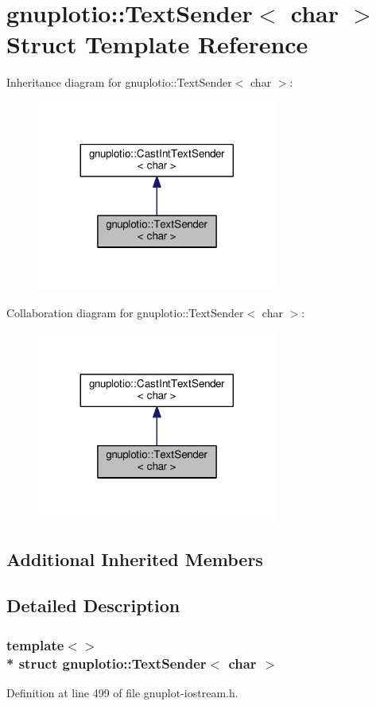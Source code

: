 \hypertarget{structgnuplotio_1_1_text_sender_3_01char_01_4}{}\section{gnuplotio\+:\+:Text\+Sender$<$ char $>$ Struct Template Reference}
\label{structgnuplotio_1_1_text_sender_3_01char_01_4}


Inheritance diagram for gnuplotio\+:\+:Text\+Sender$<$ char $>$\+:\nopagebreak
\begin{figure}[H]
\begin{center}
\leavevmode
\includegraphics[width=224pt]{structgnuplotio_1_1_text_sender_3_01char_01_4__inherit__graph}
\end{center}
\end{figure}


Collaboration diagram for gnuplotio\+:\+:Text\+Sender$<$ char $>$\+:\nopagebreak
\begin{figure}[H]
\begin{center}
\leavevmode
\includegraphics[width=224pt]{structgnuplotio_1_1_text_sender_3_01char_01_4__coll__graph}
\end{center}
\end{figure}
\subsection*{Additional Inherited Members}


\subsection{Detailed Description}
\subsubsection*{template$<$$>$\\*
struct gnuplotio\+::\+Text\+Sender$<$ char $>$}



Definition at line 499 of file gnuplot-\/iostream.\+h.

